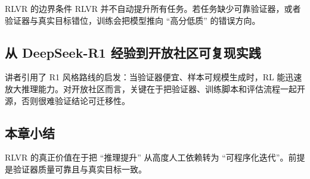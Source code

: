 \begin{warningbox}{RLVR 的边界条件}
RLVR 并不自动提升所有任务。若任务缺少可靠验证器，或者验证器与真实目标错位，训练会把模型推向 ``高分低质'' 的错误方向。
\end{warningbox}

\subsection{从 DeepSeek-R1 经验到开放社区可复现实践}
讲者引用了 R1 风格路线的启发：当验证器便宜、样本可规模生成时，RL 能迅速放大推理能力。对开放社区而言，关键在于把验证器、训练脚本和评估流程一起开源，否则很难验证结论可迁移性。

\subsection{本章小结}
RLVR 的真正价值在于把 ``推理提升'' 从高度人工依赖转为 ``可程序化迭代''。前提是验证器质量可靠且与真实目标一致。


